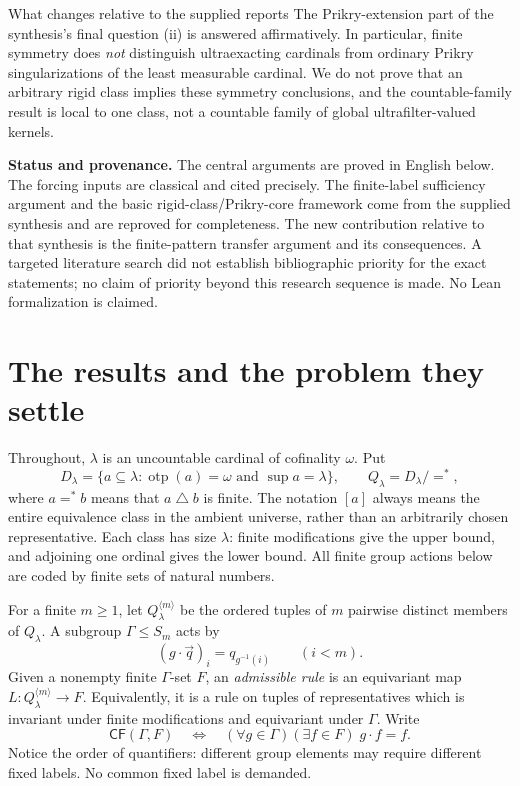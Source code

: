 \documentclass[11pt,letterpaper]{article}
\theoremstyle{definition}
\numberwithin{equation}{section}
\newcommand{\CF}{\mathsf{CF}}
\DeclareMathOperator{\otp}{otp}
\begin{document}
\begin{assessment}{What changes relative to the supplied reports}
The Prikry-extension part of the synthesis's final question (ii) is answered affirmatively. In particular, finite symmetry does \emph{not} distinguish ultraexacting cardinals from ordinary Prikry singularizations of the least measurable cardinal. We do not prove that an arbitrary rigid class implies these symmetry conclusions, and the countable-family result is local to one class, not a countable family of global ultrafilter-valued kernels.
\end{assessment}

\textbf{Status and provenance.} The central arguments are proved in English below. The forcing inputs are classical and cited precisely. The finite-label sufficiency argument and the basic rigid-class/Prikry-core framework come from the supplied synthesis and are reproved for completeness. The new contribution relative to that synthesis is the finite-pattern transfer argument and its consequences. A targeted literature search did not establish bibliographic priority for the exact statements; no claim of priority beyond this research sequence is made. No Lean formalization is claimed.

\newpage
\tableofcontents
\newpage
\section{The results and the problem they settle}\label{sec:results}

Throughout, $\lambda$ is an uncountable cardinal of cofinality $\omega$. Put
\[
 D_\lambda=\{a\subseteq\lambda:\otp(a)=\omega\text{ and }\sup a=\lambda\},
 \qquad Q_\lambda=D_\lambda/{=^*},
\]
where $a=^*b$ means that $a\mathbin\triangle b$ is finite. The notation $[a]$ always means the entire equivalence class in the ambient universe, rather than an arbitrarily chosen representative. Each class has size $\lambda$: finite modifications give the upper bound, and adjoining one ordinal gives the lower bound. All finite group actions below are coded by finite sets of natural numbers.

For a finite $m\geq1$, let $Q_\lambda^{\langle m\rangle}$ be the ordered tuples of $m$ pairwise distinct members of $Q_\lambda$. A subgroup $\Gamma\leq S_m$ acts by
\[
 (g\cdot\vec q)_i=q_{g^{-1}(i)}\qquad(i<m).
\]
Given a nonempty finite $\Gamma$-set $F$, an \emph{admissible rule} is an equivariant map $L:Q_\lambda^{\langle m\rangle}\to F$. Equivalently, it is a rule on tuples of representatives which is invariant under finite modifications and equivariant under $\Gamma$. Write
\[
 \CF(\Gamma,F)\quad\Longleftrightarrow\quad
 (\forall g\in\Gamma)(\exists f\in F)\;g\cdot f=f.
\]
Notice the order of quantifiers: different group elements may require different fixed labels. No common fixed label is demanded.
\end{document}
